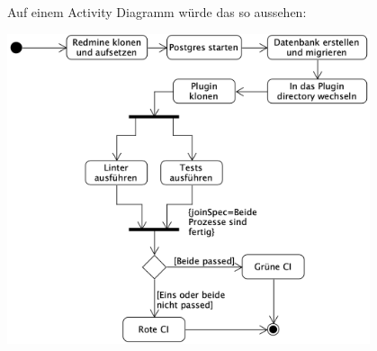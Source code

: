 \begin{minipage}{\textwidth}
  Auf einem Activity Diagramm würde das so aussehen: \newline
  \begin{center}
    \includegraphics[width=0.8\textwidth]{images/activity/ci-cd.png}
    \label{fig:activity_ci_cd}
    \newline
  \end{center}
\end{minipage}

